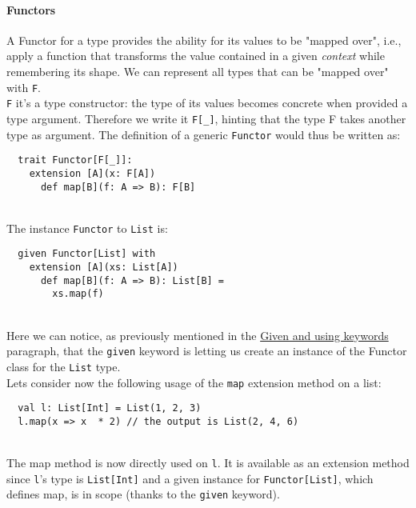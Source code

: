 \paragraph{Functors}
A Functor for a type provides the ability for its values to be "mapped over", i.e., apply a function that transforms the value contained in a given \textit{context} while remembering its shape.
We can represent all types that can be "mapped over" with \texttt{F}.\\
\texttt{F} it's a type constructor: the type of its values becomes concrete when provided a type argument.
Therefore we write it \texttt{F[\_]}, hinting that the type F takes another type as argument.
The definition of a generic \texttt{Functor} would thus be written as:
\begin{verbatim}
  trait Functor[F[_]]:
    extension [A](x: F[A])
      def map[B](f: A => B): F[B]
\end{verbatim}\mbox{}\\
The instance \texttt{Functor} to \texttt{List} is:
\begin{verbatim}
  given Functor[List] with
    extension [A](xs: List[A])
      def map[B](f: A => B): List[B] =
        xs.map(f)
\end{verbatim}\mbox{}\\
Here we can notice, as previously mentioned in the \hyperref[par:given-using]{Given and using keywords} paragraph, that the \texttt{given} keyword is letting us create an instance of the Functor class for the \texttt{List} type.\\
Lets consider now the following usage of the \texttt{map} extension method on a list:
\begin{verbatim}
  val l: List[Int] = List(1, 2, 3)
  l.map(x => x  * 2) // the output is List(2, 4, 6)
\end{verbatim}\mbox{}\\
The map method is now directly used on \texttt{l}. It is available as an extension method since \texttt{l}'s type is \texttt{List[Int]} and a given instance for \texttt{Functor[List]}, which defines map, is in scope (thanks to the \texttt{given} keyword).

